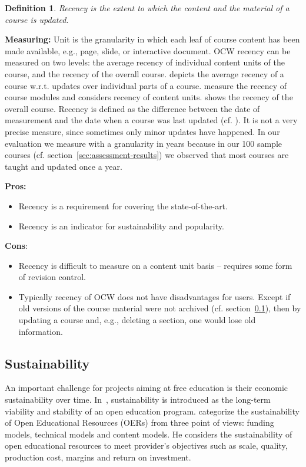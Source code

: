 \documentclass{sig-alternate}
\theoremstyle{definition}
\newtheorem{defn}{Definition}
\begin{document}
\begin{defn}
\emph{Recency is the extent to which the content and the material of a course is updated.}
\end{defn}

\noindent\textbf{Measuring:}
Unit is the granularity in which each leaf of course content has been made available, e.g., page, slide, or interactive document.
OCW recency can be measured on two levels: the average recency of individual content units of the course, and the recency of the overall course.
 depicts the average recency of a course w.r.t. updates over individual parts of a course.
 measure the recency of course modules and  considers recency of content units. 
 shows the recency of the overall course.
Recency is defined as the difference between the date of measurement  and the date when a course was last updated  (cf. \parencite{BaezaYates.2004}).
It is not a very precise measure, since sometimes only minor updates have happened.
In our evaluation we measure with a granularity in years because in our 100 sample courses (cf. section~\ref{sec:assessment-results}) we observed that most courses are taught and updated once a year.

\noindent\textbf{Pros:}
\begin{itemize}
\item Recency is a requirement for covering the state-of-the-art.
\item Recency is an indicator for sustainability and popularity.
\end{itemize}
\noindent\textbf{Cons}:
\begin{itemize}
\item Recency is difficult to measure on a content unit basis -- requires some form of revision control.
\item Typically recency of OCW does not have disadvantages for users.
Except if old versions of the course material were not archived (cf. section~\ref{sec:sustainability}), then by updating a course and, e.g., deleting a section, one would lose old information.
\end{itemize}

\subsection{Sustainability}
\label{sec:sustainability}
An important challenge for projects aiming at free education is their economic sustainability over time.
In~\parencite{Dholakia.2006}, sustainability is introduced as the long-term viability and stability of an open education program.
 categorize the sustainability of Open Educational Resources (OERs) from three point of views: funding models, technical models and content models.
He considers the sustainability of open educational resources to meet provider's objectives such as scale, quality, production cost, margins and return on investment.
\end{document}
